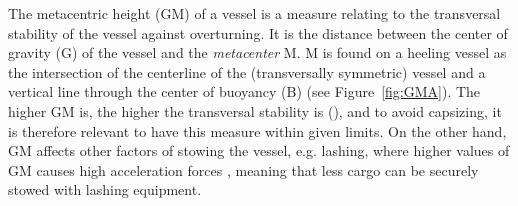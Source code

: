 The metacentric height (GM) of a vessel is a measure relating to the transversal stability of the vessel against overturning. It is the distance between the center of gravity (G) of the vessel and the \emph{metacenter} M. M is found on a heeling vessel as the intersection of the centerline of the (transversally symmetric) vessel and a vertical line through the center of buoyancy (B) (see Figure~\ref{fig:GMA}). The higher GM is, the higher the transversal stability is (\cite{JPAV18}), and to avoid capsizing, it is therefore relevant to have this measure within given limits. 
On the other hand, GM affects other factors of stowing the vessel, e.g. lashing, where {higher} values of GM causes high acceleration forces , meaning that less cargo can be securely stowed with lashing equipment. 

